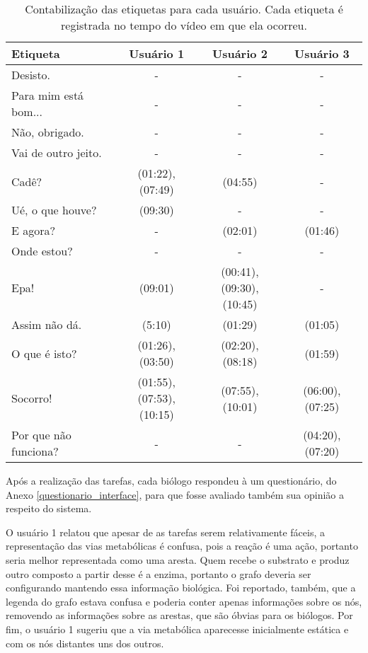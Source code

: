 \begin{table}[h!]
  \centering
  \caption{Contabilização das etiquetas para cada usuário. Cada etiqueta é registrada no tempo do vídeo em que ela ocorreu.}
  \label{tabela_de_etiquetas}
  \begin{tabular}{|l|c|c|c|}
  \hline
  {\cellcolor[HTML]{DFDFDF}Etiqueta} & {\cellcolor[HTML]{DFDFDF}Usuário 1} & {\cellcolor[HTML]{DFDFDF}Usuário 2} & {\cellcolor[HTML]{DFDFDF}Usuário 3} \\ \hline
  Desisto. & - & - & - \\ \hline
  Para mim está bom... & - & - & - \\ \hline
  Não, obrigado. & - & - & - \\ \hline
  Vai de outro jeito. & - & - & - \\ \hline
  Cadê? & (01:22), (07:49) & (04:55) & - \\ \hline
  Ué, o que houve? & (09:30) & - & - \\ \hline
  E agora? & - & (02:01) & (01:46) \\ \hline
  Onde estou? & - & - & - \\ \hline
  Epa! & (09:01) & \specialcell{(00:41), (09:30),\\(10:45)} & - \\ \hline
  Assim não dá. & (5:10) & (01:29) & (01:05) \\ \hline
  O que é isto? & (01:26), (03:50) & (02:20), (08:18) & (01:59) \\ \hline
  Socorro! & \specialcell{(01:55), (07:53),\\(10:15)} & (07:55), (10:01) & (06:00), (07:25) \\ \hline
  Por que não funciona? & - & - & (04:20), (07:20) \\ \hline
  \end{tabular}
\end{table}

\indent Após a realização das tarefas, cada biólogo respondeu à um questionário, do Anexo \ref{questionario_interface}, para que fosse avaliado também sua opinião a respeito do sistema.

\indent O usuário 1 relatou que apesar de as tarefas serem relativamente fáceis, a representação das vias metabólicas é confusa, pois a reação é uma ação, portanto seria melhor representada como uma aresta. Quem recebe o substrato e produz outro composto a partir desse é a enzima, portanto o grafo deveria ser configurando mantendo essa informação biológica. Foi reportado, também, que a legenda do grafo estava confusa e poderia conter apenas informações sobre os nós, removendo as informações sobre as arestas, que são óbvias para os biólogos. Por fim, o usuário 1 sugeriu que a via metabólica aparecesse inicialmente estática e com os nós distantes uns dos outros.

